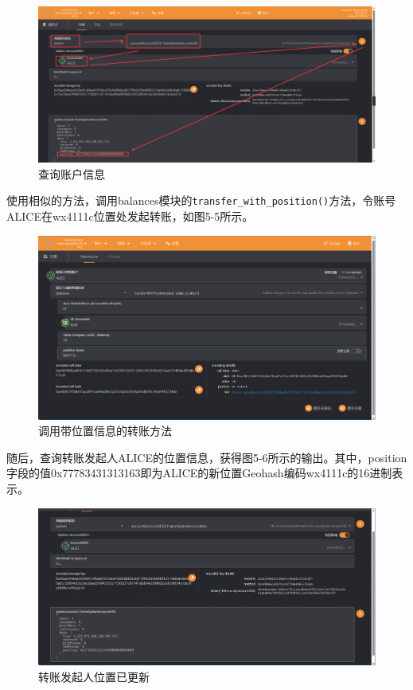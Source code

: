 \begin{figure}[htbp]
    \centering
    \includegraphics[width=\textwidth]{images/watchAccInfo.png}
    \caption{查询账户信息}\label{查询账户信息} %
\end{figure}

使用相似的方法，调用balances模块的\verb|transfer_with_position()|方法，令账号ALICE在wx4111c位置处发起转账，如图5-5所示。

\begin{figure}[htbp]
    \centering
    \includegraphics[width=\textwidth]{images/transWithPos.png}
    \caption{调用带位置信息的转账方法}\label{调用带位置信息的转账方法} %
\end{figure}

随后，查询转账发起人ALICE的位置信息，获得图5-6所示的输出。其中，position字段的值0x77783431313163即为ALICE的新位置Geohash编码wx4111c的16进制表示。

\begin{figure}[htbp]
    \centering
    \includegraphics[width=\textwidth]{images/transWithPosResult.png}
    \caption{转账发起人位置已更新}\label{转账发起人位置已更新} %
\end{figure}

